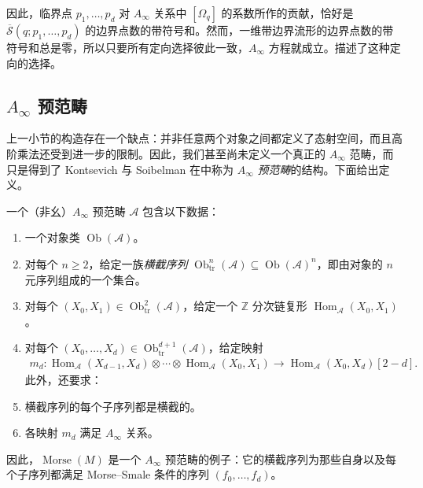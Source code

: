 因此，临界点 $p_1,\ldots,p_d$ 对 $A_\infty$ 关系中 $[\Omega_q]$ 的系数所作的贡献，恰好是 $\overline{\mathcal S}(q;p_1,\ldots,p_d)$ 的边界点数的带符号和。然而，一维带边界流形的边界点数的带符号和总是零，所以只要所有定向选择彼此一致，$A_\infty$ 方程就成立。描述了这种定向的选择。

\subsection{\texorpdfstring{$A_\infty$}{A∞} 预范畴}\label{sec:8.3.2}

上一小节的构造存在一个缺点：并非任意两个对象之间都定义了态射空间，而且高阶乘法还受到进一步的限制。因此，我们甚至尚未定义一个真正的 $A_\infty$ 范畴，而只是得到了 Kontsevich 与 Soibelman 在中称为 $A_\infty$ \emph{预范畴}的结构。下面给出定义。

\begin{definition}\label{def:8.11}
一个（非幺）$A_\infty$ 预范畴 $\mathcal A$ 包含以下数据：
\begin{enumerate}
\item 一个对象类 $\operatorname{Ob}(\mathcal A)$。
\item 对每个 $n\geq2$，给定一族\emph{横截序列}
$\operatorname{Ob}_{\mathrm{tr}}^n(\mathcal A)\subseteq
\operatorname{Ob}(\mathcal A)^n$，即由对象的 $n$ 元序列组成的一个集合。
\item 对每个 $(X_0,X_1)\in\operatorname{Ob}_{\mathrm{tr}}^2(\mathcal A)$，给定一个 $\mathbb Z$ 分次链复形 $\operatorname{Hom}_{\mathcal A}(X_0,X_1)$。
\item 对每个 $(X_0,\ldots,X_d)\in\operatorname{Ob}_{\mathrm{tr}}^{d+1}(\mathcal A)$，给定映射
\[
\begin{aligned}
m_d\colon\operatorname{Hom}_{\mathcal A}(X_{d-1},X_d)\otimes\cdots
\otimes\operatorname{Hom}_{\mathcal A}(X_0,X_1)
\longrightarrow\operatorname{Hom}_{\mathcal A}(X_0,X_d)[2-d].
\end{aligned}
\]
此外，还要求：
\item 横截序列的每个子序列都是横截的。
\item 各映射 $m_d$ 满足 $A_\infty$ 关系。
\end{enumerate}
\end{definition}

因此，$\operatorname{Morse}(M)$ 是一个 $A_\infty$ 预范畴的例子：它的横截序列为那些自身以及每个子序列都满足 Morse--Smale 条件的序列 $(f_0,\ldots,f_d)$。

